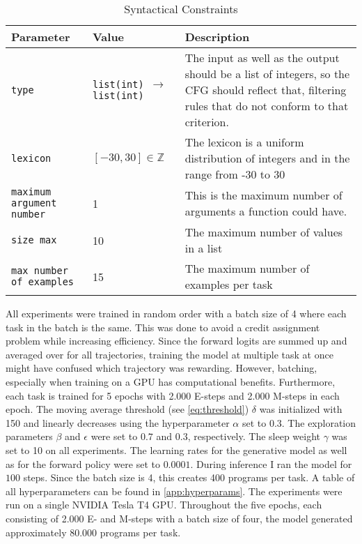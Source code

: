 \begin{table}[H]
    \centering
    \begin{tabularx}{\textwidth}{|l|l|X|}
        \hline
        \textbf{Parameter} & \textbf{Value} & \textbf{Description} \\\hline
        \texttt{type} & \texttt{list(int) $\rightarrow$ list(int)} & The input as well as the output should be a list of integers, so the CFG should reflect that, filtering rules that do not conform to that criterion. \\\hline
        \texttt{lexicon} &  $[-30, 30] \in \mathbb{Z}$ & The lexicon is a uniform distribution of integers and in the range from -30 to 30 \\\hline
        \texttt{maximum argument number} & 1 & This is the maximum number of arguments a function could have. \\\hline
        \texttt{size max} & 10 & The maximum number of values in a list \\\hline 
        \texttt{max number of examples} & 15 & The maximum number of examples per task \\\hline 
    \end{tabularx}
    \caption{Syntactical Constraints}
    \label{tab:synconst}
\end{table}

All experiments were trained in random order with a batch size of 4 where each task in the batch is the same. This was done to avoid a credit assignment problem while increasing efficiency. Since the forward logits are summed up and averaged over for all trajectories, training the model at multiple task at once might have confused which trajectory was rewarding. However, batching, especially when training on a GPU has computational benefits.
Furthermore, each task is trained for 5 epochs with 2.000 E-steps and 2.000 M-steps in each epoch. The moving average threshold (see \autoref{eq:threshold}) $\delta$ was initialized with 150 and linearly decreases using the hyperparameter $\alpha$ set to $0.3$. The exploration parameters $\beta$ and $\epsilon$ were set to $0.7$ and $0.3$, respectively. The sleep weight $\gamma$ was set to 10 on all experiments. 
The learning rates for the generative model as well as for the forward policy were set to $0.0001$. During inference I ran the model for $100$ steps. Since the batch size is 4, this creates 400 programs per task. A table of all hyperparameters can be found in \autoref{app:hyperparams}. The experiments were run on a single NVIDIA Tesla T4 GPU. Throughout the five epochs, each consisting of 2.000 E- and M-steps with a batch size of four, the model generated approximately 80.000 programs per task.

